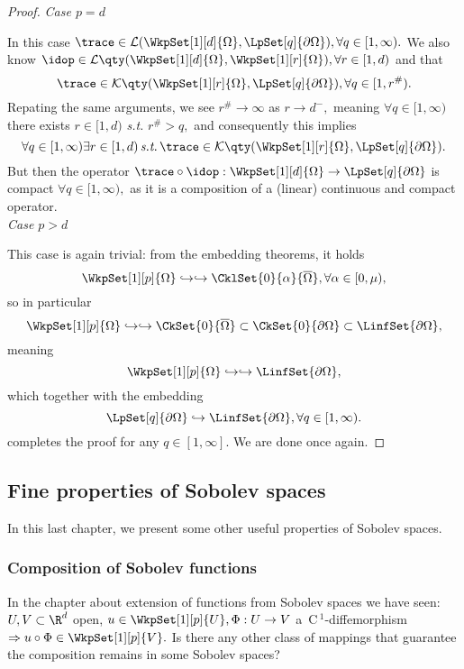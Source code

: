 \begin{proof}
\textit{Case $p = d$}

In this case $\trace \in \mathcal{L}(\WkpSet[1][d]{\Omega}, \LpSet[q]{\partial \Omega}), \forall q \in [1,\infty).$ We also know $\idop \in \mathcal{L}\qty(\WkpSet[1][d]{\Omega}, \WkpSet[1][r]{\Omega}), \forall r \in [1,d)$ and that
\[
	\trace \in \mathcal{K}\qty(\WkpSet[1][r]{\Omega}, \LpSet[q]{\partial \Omega}), \forall q \in [1, r^{\#}).
\]
Repating the same arguments, we see $r^{\#} \to \infty$ as $r \to d^-,$ meaning $\forall q \in [1,\infty)$ there exists $r \in [1,d)$ \textit{s.t.} $r^{\#} > q,$ and consequently this implies
\[
	\forall q \in [1, \infty) \exists r \in [1,d) \, \text{\textit{s.t.}} \, \trace \in \mathcal{K}\qty(\WkpSet[1][r]{\Omega}, \LpSet[q]{\partial \Omega}).
\]
But then the operator $\trace \circ \idop: \WkpSet[1][d]{\Omega} \to \LpSet[q]{\partial \Omega}$ is compact $\forall q \in [1, \infty),$ as it is a composition of a (linear) continuous and compact operator. \\

\textit{Case $p > d$}

This case is again trivial: from the embedding theorems, it holds
\[
	\WkpSet[1][p]{\Omega} \hookrightarrow \hookrightarrow \CklSet{0}{\alpha}{\overline{\Omega}}, \forall \alpha \in [0,\mu),
\]
so in particular
\[
	\WkpSet[1][p]{\Omega} \hookrightarrow \hookrightarrow \CkSet{0}{\overline{\Omega}} \subset \CkSet{0}{\partial \Omega} \subset \LinfSet{\partial \Omega},
\]
meaning
\[
	\WkpSet[1][p]{\Omega} \hookrightarrow \hookrightarrow \LinfSet{\partial \Omega},
\]
which together with the embedding
\[
	\LpSet[q]{\partial \Omega} \hookrightarrow \LinfSet{\partial \Omega}, \forall q \in [1, \infty).
\]
completes the proof for any $q \in [1, \infty].$ We are done once again.

\end{proof}

\subsection{Fine properties of Sobolev spaces}
\label{sec:fine_properties}
In this last chapter, we present some other useful properties of Sobolev spaces.

\subsubsection{Composition of Sobolev functions}
\label{sec:composition}

In the chapter about extension of functions from Sobolev spaces we have seen: $U,V \subset \R^{d}$ open, $u \in \WkpSet[1][p]{U}, \Phi: U \to V$ a $\, \text{C} \,^1$-diffemorphism $\Rightarrow u \circ \Phi \in \WkpSet[1][p]{V}.$ Is there any other class of mappings that guarantee the composition remains in some Sobolev spaces?

